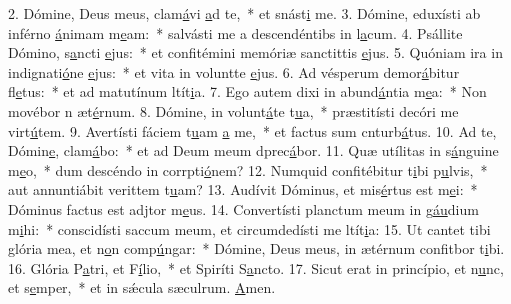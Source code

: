 2. Dómine, Deus meus, clam\uline{á}vi \uline{a}d te,~* et snást\uline{i} me.
3. Dómine, eduxísti ab inférno \uline{á}nimam m\uline{e}am:~* salvásti me a descendéntibs in l\uline{a}cum.
4. Psállite Dómino, s\uline{a}ncti \uline{e}jus:~* et confitémini memóriæ sanctittis \uline{e}jus.
5. Quóniam ira in indignati\uline{ó}ne \uline{e}jus:~* et vita in voluntte \uline{e}jus.
6. Ad vésperum demor\uline{á}bitur fl\uline{e}tus:~* et ad matutínum ltít\uline{i}a.
7. Ego autem dixi in abund\uline{á}ntia m\uline{e}a:~* Non movébor n æt\uline{é}rnum.
8. Dómine, in volunt\uline{á}te t\uline{u}a,~* præstitísti decóri me virt\uline{ú}tem.
9. Avertísti fáciem t\uline{u}am \uline{a} me,~* et factus sum cnturb\uline{á}tus.
10. Ad te, Dómin\uline{e}, clam\uline{á}bo:~* et ad Deum meum dprec\uline{á}bor.
11. Quæ utílitas in s\uline{á}nguine m\uline{e}o,~* dum descéndo in corrpti\uline{ó}nem?
12. Numquid confitébitur t\uline{i}bi p\uline{u}lvis,~* aut annuntiábit verittem t\uline{u}am?
13. Audívit Dóminus, et mis\uline{é}rtus est m\uline{e}i:~* Dóminus factus est adjtor m\uline{e}us.
14. Convertísti planctum meum in g\uline{áu}dium m\uline{i}hi:~* conscidísti saccum meum, et circumdedísti me ltít\uline{i}a:
15. Ut cantet tibi glória mea, et n\uline{o}n comp\uline{ú}ngar:~* Dómine, Deus meus, in ætérnum confitbor t\uline{i}bi.
16. Glória P\uline{a}tri, et F\uline{í}lio,~* et Spiríti S\uline{a}ncto.
17. Sicut erat in princípio, et n\uline{u}nc, et s\uline{e}mper,~* et in sǽcula sæculrum. \uline{A}men.
